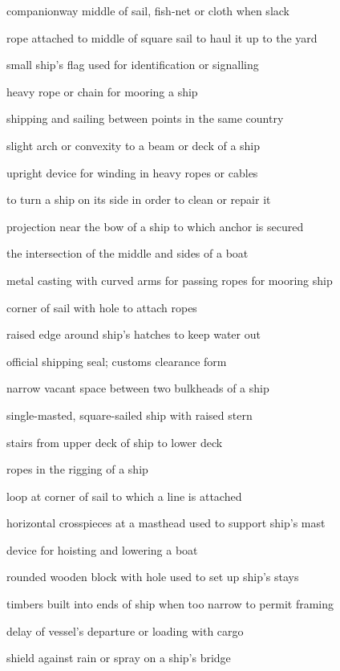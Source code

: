 \documentclass[
  11pt,
  msmallroyalvopaper
]{memoir}
\begin{document}
\begin{labeling}{companionway}
middle of sail, fish-net or cloth when slack
\item[buntline]
rope attached to middle of square sail to haul it up to the yard
\item[burgee]
small ship's flag used for identification or signalling
\item[cable]
heavy rope or chain for mooring a ship
\item[cabotage]
shipping and sailing between points in the same country
\item[camber]
slight arch or convexity to a beam or deck of a ship
\item[capstan]
upright device for winding in heavy ropes or cables
\item[careen]
to turn a ship on its side in order to clean or repair it
\item[cathead]
projection near the bow of a ship to which anchor is secured
\item[chine]
the intersection of the middle and sides of a boat
\item[chock]
metal casting with curved arms for passing ropes for mooring ship
\item[clew]
corner of sail with hole to attach ropes
\item[coaming]
raised edge around ship's hatches to keep water out
\item[cocket]
official shipping seal; customs clearance form
\item[cofferdam]
narrow vacant space between two bulkheads of a ship
\item[cog]
single-masted, square-sailed ship with raised stern
\item[companionway]
stairs from upper deck of ship to lower deck
\item[cordage]
ropes in the rigging of a ship
\item[cringle]
loop at corner of sail to which a line is attached
\item[crosstrees]
horizontal crosspieces at a masthead used to support ship's mast
\item[davit]
device for hoisting and lowering a boat
\item[deadeye]
rounded wooden block with hole used to set up ship's stays
\item[deadwood]
timbers built into ends of ship when too narrow to permit framing
\item[demurrage]
delay of vessel's departure or loading with cargo
\item[dodger]
shield against rain or spray on a ship's bridge

\end{labeling}
\end{document}
